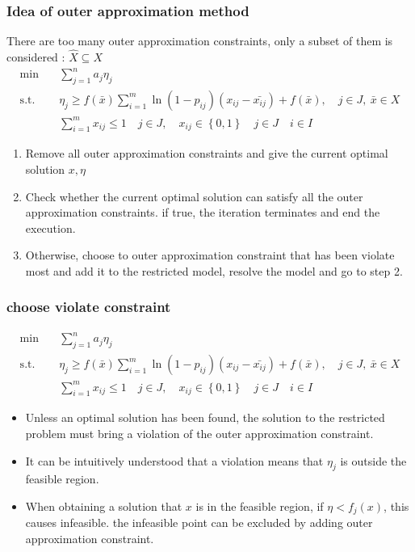 \documentclass[CJK,10pt]{beamer}
\begin{document}
\begin{frame}
    \frametitle{Idea of outer approximation method}
    {
    \scriptsize
    There are too many outer approximation constraints, only a subset of them is considered : $\hat{X} \subseteq X$
    \begin{align*}
        \min\quad & \sum_{j=1}^n a_j \eta_j \\ 
        \mathrm{s. t.}\quad & \eta_j \geq f(\bar{x})\sum_{i = 1}^m \ln(1-p_{ij})(x_{ij} - \bar{x_{ij}}) + f(\bar{x}), \quad j \in J,\ \bar{x} \in X \\ 
        &\sum_{i=1}^m x_{ij} \leq 1\quad j \in J,\quad x_{ij} \in \left\{ 0,1 \right\} \quad j\in J\quad i \in I
    \end{align*}
    \begin{enumerate}
        \item Remove all outer approximation constraints and give the current optimal solution $x, \eta$
        \item Check whether the current optimal solution can satisfy all the outer approximation constraints. if true, the iteration terminates and end the execution.
        \item Otherwise, choose to outer approximation constraint that has been violate most and add it to the restricted model, resolve the model and go to step 2.
    \end{enumerate}
    }
\end{frame}

\begin{frame}
    \frametitle{choose violate constraint}
    {
    \scriptsize
    \begin{align*}
        \min\quad & \sum_{j=1}^n a_j \eta_j \\ 
        \mathrm{s. t.}\quad & \eta_j \geq f(\bar{x})\sum_{i = 1}^m \ln(1-p_{ij})(x_{ij} - \bar{x_{ij}}) + f(\bar{x}), \quad j \in J,\ \bar{x} \in X \\ 
        &\sum_{i=1}^m x_{ij} \leq 1\quad j \in J,\quad x_{ij} \in \left\{ 0,1 \right\} \quad j\in J\quad i \in I
    \end{align*}
    \begin{itemize}
        \item Unless an optimal solution has been found, the solution to the restricted problem must bring a violation of the outer approximation constraint.
        \item It can be intuitively understood that a violation means that $\eta_j$ is outside the feasible region.
        \item When obtaining a solution that $x$ is in the feasible region, if $\eta < f_j(x)$, this causes infeasible. the infeasible point can be excluded by adding outer approximation constraint.
    \end{itemize}
    }
\end{frame}
\end{document}
